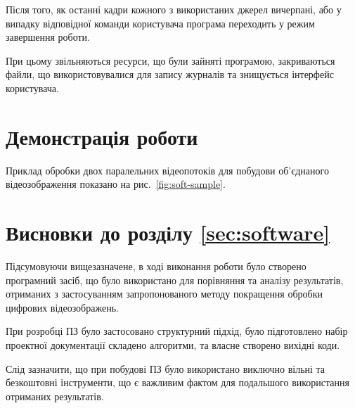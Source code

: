 Після того, як останні кадри кожного з використаних джерел вичерпані, або у випадку відповідної команди користувача програма переходить у режим завершення роботи. 

При цьому звільняються ресурси, що були зайняті програмою, закриваються файли, що використовувалися для запису журналів та знищується інтерфейс користувача.

\section{Демонстрація роботи}

Приклад обробки двох паралельних відеопотоків для побудови об'єднаного відеозображення показано на рис.~\ref{fig:soft-sample}.


\section{Висновки до розділу \ref{sec:software}}

Підсумовуючи вищезазначене, в ході виконання роботи було створено програмний засіб, що було використано для порівняння та аналізу результатів, отриманих з застосуванням запропонованого методу покращення обробки цифрових відеозображень. 

При розробці ПЗ було застосовано структурний підхід, було підготовлено набір проектної документації складено алгоритми, та власне створено вихідні коди. 

Слід зазначити, що при побудові ПЗ було використано виключно вільні та безкоштовні інструменти, що є важливим фактом для подальшого використання отриманих результатів.
